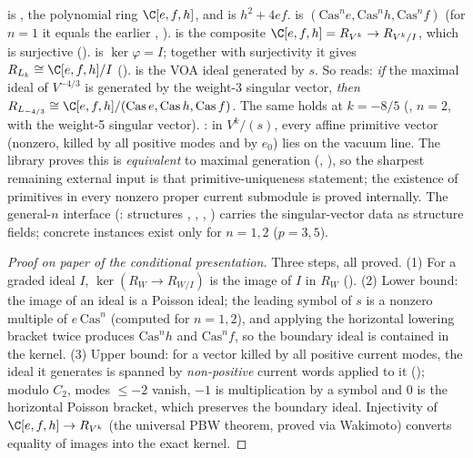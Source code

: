 \begin{dictionary}
 is , the polynomial ring $\C[e,f,h]$, and  is
$h^2+4ef$.  is $(\mathrm{Cas}^ne,\mathrm{Cas}^nh,\mathrm{Cas}^nf)$ (for $n=1$ it equals the
earlier , ).  is the composite
$\C[e,f,h] = R_{V^k}\to R_{V^k/I}$, which is surjective ().
 is $\ker\varphi = I$; together with surjectivity it gives
$R_{L_k}\cong\C[e,f,h]/I$ ().
 is the VOA ideal generated by $s$. So
 reads: \emph{if} the maximal ideal of $V^{-4/3}$ is
generated by the weight-3 singular vector, \emph{then} $R_{L_{-4/3}}\cong\C[e,f,h]/(\mathrm{Cas}\,e,\mathrm{Cas}\,h,\mathrm{Cas}\,f)$.
The same holds at $k=-8/5$ (, $n=2$, with the
weight-5 singular vector). : in $V^k/(s)$, every affine primitive
vector (nonzero, killed by all positive modes and by $e_0$) lies on the vacuum line. The library proves
this is \emph{equivalent} to maximal generation (,
), so the sharpest remaining external input is
that primitive-uniqueness statement; the existence of primitives in every nonzero proper current
submodule is proved internally. The general-$n$ interface (:
structures , , ,
) carries the singular-vector data as structure fields; concrete instances exist only
for $n = 1,2$ ($p = 3,5$).
\end{dictionary}

\begin{proof}[Proof on paper of the conditional presentation]
Three steps, all proved. (1) For a graded ideal $I$, $\ker(R_W\to R_{W/I})$ is the image of $I$ in $R_W$
(). (2) Lower bound: the image of an ideal is a Poisson ideal; the
leading symbol of $s$ is a nonzero multiple of $e\,\mathrm{Cas}^n$ (computed for $n=1,2$), and applying the
horizontal lowering bracket twice produces $\mathrm{Cas}^nh$ and $\mathrm{Cas}^nf$, so the boundary ideal is
contained in the kernel. (3) Upper bound: for a vector killed by all positive current modes, the
ideal it generates is spanned by \emph{non-positive} current words applied to it
(); modulo $C_2$, modes $\le-2$ vanish, $-1$ is multiplication
by a symbol and $0$ is the horizontal Poisson bracket, which preserves the boundary ideal. Injectivity
of $\C[e,f,h]\to R_{V^k}$ (the universal PBW theorem, proved via Wakimoto) converts equality of images
into the exact kernel.
\end{proof}


